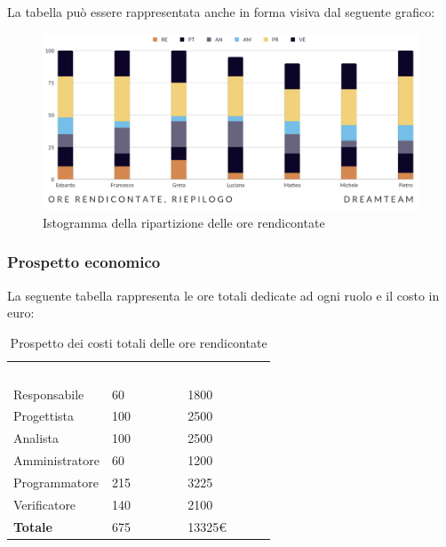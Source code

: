 La tabella può essere rappresentata anche in forma visiva dal seguente grafico:
\begin{figure}[H]
\centering
\includegraphics[scale=0.65]{Sezioni/SezioniPreventivo/grafici/Riepilogo_ore_rendicontate.png}
\caption{Istogramma della ripartizione delle ore rendicontate}
\end{figure}

\subsubsection{Prospetto economico}
La seguente tabella rappresenta le ore totali dedicate ad ogni ruolo e il costo in euro:

\begin{table}[H]
\begin{center}
\renewcommand{\arraystretch}{1.5}
\begin{tabular}{ m{}<{\centering}  m{}<{\centering} m{}<{\centering}}
	\rowcolor{darkblue}
	\textcolor{white}{\textbf{Ruolo}}&\textcolor{white}{\textbf{Totale ore}}&\textcolor{white}{\textbf{Costo totale}}\\ 

	Responsabile  & 60 & 1800 \\	
	
	Progettista & 100 & 2500 \\
	
	Analista & 100 & 2500 \\

	Amministratore & 60 & 1200 \\
	
	Programmatore & 215 & 3225 \\
	
	Verificatore & 140 & 2100 \\
	
	\textbf{Totale} & 675 & 13325\euro \\
	
\end{tabular}
\caption{Prospetto dei costi totali delle ore rendicontate}
\end{center}
\end{table}

